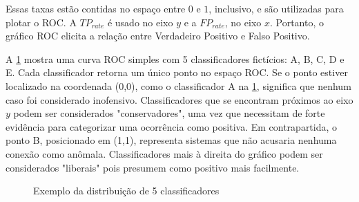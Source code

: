 Essas taxas estão contidas no espaço entre $0$ e $1$, inclusivo, e são utilizadas para plotar o ROC. A $TP_{rate}$ é
usado no eixo $y$ e a $FP_{rate}$, no eixo $x$. Portanto, o gráfico ROC elicita a relação entre Verdadeiro Positivo e
Falso Positivo.
\par A \ref{fig:roc} mostra uma curva ROC simples com 5 classificadores fictícios: A, B, C, D e E. Cada classificador
retorna um único ponto no espaço ROC. Se o ponto estiver localizado na coordenada (0,0), como o classificador A na
\ref{fig:roc}, significa que nenhum caso foi considerado inofensivo. Classificadores que se encontram próximos ao eixo
$y$ podem ser considerados "conservadores", uma vez que necessitam de forte evidência para categorizar uma ocorrência
como positiva. Em contrapartida, o ponto B, posicionado em (1,1), representa sistemas que não acusaria nenhuma
conexão como anômala. Classificadores mais à direita do gráfico podem ser considerados "liberais" pois presumem como
positivo mais facilmente.

\begin{figure}
  \centering
    \caption{Exemplo da distribuição de 5 classificadores}
    \label{fig:roc}
\end{figure}

